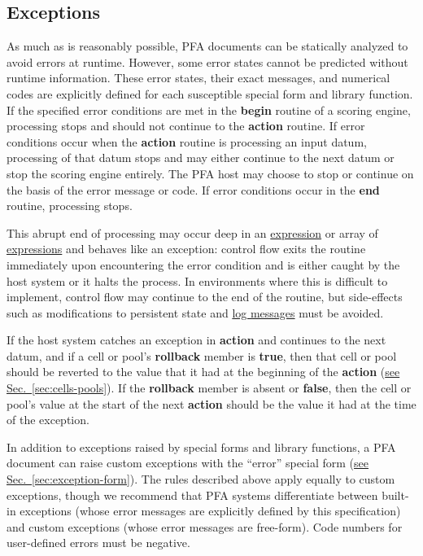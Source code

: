 \documentclass{article}
\newcommand{\PFAc}{\ttfamily\bfseries}
\theoremstyle{definition}
\begin{document}
\subsection{Exceptions}
\label{sec:exceptions}

As much as is reasonably possible, PFA documents can be statically analyzed to avoid errors at runtime.  However, some error states cannot be predicted without runtime information.  These error states, their exact messages, and numerical codes are explicitly defined for each susceptible special form and library function.  If the specified error conditions are met in the {\PFAc begin} routine of a scoring engine, processing stops and should not continue to the {\PFAc action} routine.  If error conditions occur when the {\PFAc action} routine is processing an input datum, processing of that datum stops and may either continue to the next datum or stop the scoring engine entirely.  The PFA host may choose to stop or continue on the basis of the error message or code.  If error conditions occur in the {\PFAc end} routine, processing stops.

This abrupt end of processing may occur deep in an \hyperlink{hsec:expressions}{expression} or array of \hyperlink{hsec:expressions}{expressions} and behaves like an exception: control flow exits the routine immediately upon encountering the error condition and is either caught by the host system or it halts the process.  In environments where this is difficult to implement, control flow may continue to the end of the routine, but side-effects such as modifications to persistent state and \hyperlink{hsec:logs}{log messages} must be avoided.

If the host system catches an exception in {\PFAc action} and continues to the next datum, and if a cell or pool's {\PFAc rollback} member is {\PFAc true}, then that cell or pool should be reverted to the value that it had at the beginning of the {\PFAc action} (\hyperlink{hsec:cells-pools}{see Sec.~\ref{sec:cells-pools}}).  If the {\PFAc rollback} member is absent or {\PFAc false}, then the cell or pool's value at the start of the next {\PFAc action} should be the value it had at the time of the exception.

In addition to exceptions raised by special forms and library functions, a PFA document can raise custom exceptions with the ``error'' special form (\hyperlink{hsec:exception-form}{see Sec.~\ref{sec:exception-form}}).  The rules described above apply equally to custom exceptions, though we recommend that PFA systems differentiate between built-in exceptions (whose error messages are explicitly defined by this specification) and custom exceptions (whose error messages are free-form).  Code numbers for user-defined errors must be negative.
\end{document}
